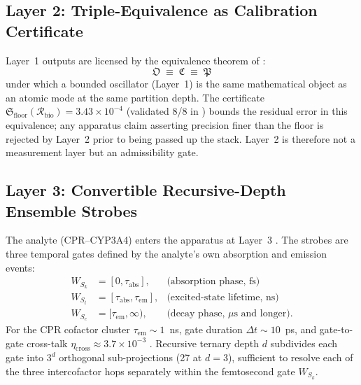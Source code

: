 \documentclass[11pt,twocolumn,a4paper]{article}
\theoremstyle{definition}
\theoremstyle{remark}
\newcommand{\Recv}{\mathcal{R}}
\newcommand{\Floor}{\mathfrak{S}_{\mathrm{floor}}}
\begin{document}
\subsection{Layer 2: Triple-Equivalence as Calibration Certificate}
\label{sec:layer2}

Layer~1 outputs are licensed by the equivalence theorem of
\citep{sachikonye2025_specderiv}:
\begin{equation}
\label{eq:triple_equivalence}
\mathfrak{O} \;\equiv\; \mathfrak{C} \;\equiv\; \mathfrak{P}
\end{equation}
under which a bounded oscillator (Layer~1) is the same mathematical
object as an atomic mode at the same partition depth. The certificate
$\Floor(\Recv_{\mathrm{bio}}) = 3.43 \times 10^{-4}$ (validated 8/8 in
\citep{sachikonye2025_paper1}) bounds the residual error in this
equivalence; any apparatus claim asserting precision finer than the
floor is rejected by Layer~2 prior to being passed up the stack. Layer~2
is therefore not a measurement layer but an admissibility gate.

\subsection{Layer 3: Convertible Recursive-Depth Ensemble Strobes}
\label{sec:layer3}

The analyte (CPR--CYP3A4) enters the apparatus at Layer~3
\citep{sachikonye2025_strobes}. The strobes are three temporal gates
defined by the analyte's own absorption and emission events:
\begin{equation}
\label{eq:strobe_windows}
\begin{aligned}
W_{S_k} &= [0, \tau_{\mathrm{abs}}],         &\text{(absorption phase, fs)}  \\
W_{S_t} &= [\tau_{\mathrm{abs}}, \tau_{\mathrm{em}}], &\text{(excited-state lifetime, ns)} \\
W_{S_e} &= [\tau_{\mathrm{em}}, \infty),     &\text{(decay phase, $\mu$s and longer).}
\end{aligned}
\end{equation}
For the CPR cofactor cluster $\tau_{\mathrm{em}} \sim 1$~ns, gate
duration $\Delta t \sim 10$~ps, and gate-to-gate cross-talk
$\eta_{\mathrm{cross}} \approx 3.7 \times 10^{-3}$
\citep{sachikonye2025_strobes}. Recursive ternary depth $d$ subdivides
each gate into $3^d$ orthogonal sub-projections (27 at $d = 3$),
sufficient to resolve each of the three intercofactor hops separately
within the femtosecond gate $W_{S_k}$.
\end{document}
